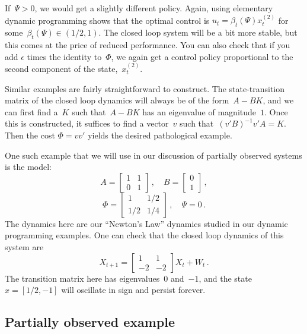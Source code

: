 \documentclass{tufte-book}
\begin{document}
If~\(\Psi>0\), we would get a slightly different policy. Again, using
elementary dynamic programming shows that the optimal control is
\(u_t=\beta_t(\Psi) x_t^{(2)}\) for some~\(\beta_t(\Psi) \in (1/2,1)\).
The closed loop system will be a bit more stable, but this comes at the
price of reduced performance. You can also check that if you add
\(\epsilon\) times the identity to~\(\Phi\), we again get a control
policy proportional to the second component of the state,~\(x_t^{(2)}\).

Similar examples are fairly straightforward to construct. The
state-transition matrix of the closed loop dynamics will always be of
the form~\(A-BK\), and we can first find a~\(K\) such that~\(A-BK\) has
an eigenvalue of magnitude~\(1\). Once this is constructed, it suffices
to find a vector~\(v\) such that~\((v'B)^{-1} v'A = K\). Then the cost
\(\Phi=vv'\) yields the desired pathological example.

One such example that we will use in our discussion of partially
observed systems is the model: \[
    A = \begin{bmatrix} 1 & 1\\ 0 & 1\end{bmatrix} \,,\quad B = \begin{bmatrix} 0\\1 \end{bmatrix}\,,
\] \[
    \Phi = \begin{bmatrix} 1 & 1/2 \\ 1/2 & 1/4 \end{bmatrix} \,, \quad \Psi = 0\,.
\] The dynamics here are our ``Newton's Law'' dynamics studied in our
dynamic programming examples. One can check that the closed loop
dynamics of this system are \[
    X_{t+1} = \begin{bmatrix} 1 & 1\\ -2 &-2 \end{bmatrix} X_t + W_t\,.
\] The transition matrix here has eigenvalues~\(0\) and~\(-1\), and the
state~\(x=[1/2,-1]\) will oscillate in sign and persist forever.

\hypertarget{partially-observed-example}{%
\subsection{Partially observed
example}\label{partially-observed-example}}
\end{document}
